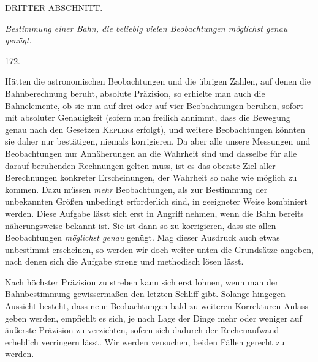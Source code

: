 \clearpage
{}
\begin{center}
{\large DRITTER ABSCHNITT.}\par\medskip
\emph{Bestimmung einer Bahn, die beliebig vielen Beobachtungen möglichst genau genügt.}\par\bigskip
\hypertarget{native-242-article172}{}172.
\end{center}
Hätten die astronomischen Beobachtungen und die übrigen Zahlen, auf denen die Bahnberechnung beruht, absolute Präzision, so erhielte man auch die Bahnelemente, ob sie nun auf drei oder auf vier Beobachtungen beruhen, sofort mit absoluter Genauigkeit (sofern man freilich annimmt, dass die Bewegung genau nach den Gesetzen \textsc{Kepler}s erfolgt), und weitere Beobachtungen könnten sie daher nur bestätigen, niemals korrigieren. Da aber alle unsere Messungen und Beobachtungen nur Annäherungen an die Wahrheit sind und dasselbe für alle darauf beruhenden Rechnungen gelten muss, ist es das oberste Ziel aller Berechnungen konkreter Erscheinungen, der Wahrheit so nahe wie möglich zu kommen. Dazu müssen \emph{mehr} Beobachtungen, als zur Bestimmung der unbekannten Größen unbedingt erforderlich sind, in geeigneter Weise kombiniert werden. Diese Aufgabe lässt sich erst in Angriff nehmen, wenn die Bahn bereits näherungsweise bekannt ist. Sie ist dann so zu korrigieren, dass sie allen Beobachtungen \emph{möglichst genau} genügt. Mag dieser Ausdruck auch etwas unbestimmt erscheinen, so werden wir doch weiter unten die Grundsätze angeben, nach denen sich die Aufgabe streng und methodisch lösen lässt.

Nach höchster Präzision zu streben kann sich erst lohnen, wenn man der Bahnbestimmung gewissermaßen den letzten Schliff gibt. Solange hingegen Aussicht besteht, dass neue Beobachtungen bald zu weiteren Korrekturen Anlass geben werden, empfiehlt es sich, je nach Lage der Dinge mehr oder weniger auf äußerste Präzision zu verzichten, sofern sich dadurch der Rechenaufwand erheblich verringern lässt. Wir werden versuchen, beiden Fällen gerecht zu werden.
